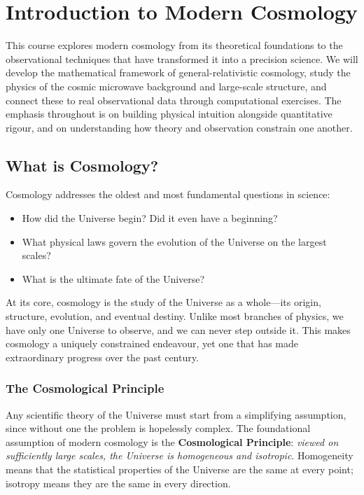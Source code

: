 \chapter{Introduction to Modern Cosmology}
\label{ch:introduction}

This course explores modern cosmology from its theoretical foundations to the observational techniques that have transformed it into a precision science. We will develop the mathematical framework of general-relativistic cosmology, study the physics of the cosmic microwave background and large-scale structure, and connect these to real observational data through computational exercises. The emphasis throughout is on building physical intuition alongside quantitative rigour, and on understanding how theory and observation constrain one another.

\section{What is Cosmology?}
\label{sec:what_is_cosmology}

Cosmology addresses the oldest and most fundamental questions in science:
\begin{itemize}
    \item How did the Universe begin? Did it even have a beginning?
    \item What physical laws govern the evolution of the Universe on the largest scales?
    \item What is the ultimate fate of the Universe?
\end{itemize}
At its core, cosmology is the study of the Universe as a whole---its origin, structure, evolution, and eventual destiny. Unlike most branches of physics, we have only one Universe to observe, and we can never step outside it. This makes cosmology a uniquely constrained endeavour, yet one that has made extraordinary progress over the past century.

\subsection{The Cosmological Principle}

Any scientific theory of the Universe must start from a simplifying assumption, since without one the problem is hopelessly complex. The foundational assumption of modern cosmology is the \textbf{Cosmological Principle}: \textit{viewed on sufficiently large scales, the Universe is homogeneous and isotropic}. Homogeneity means that the statistical properties of the Universe are the same at every point; isotropy means they are the same in every direction.

